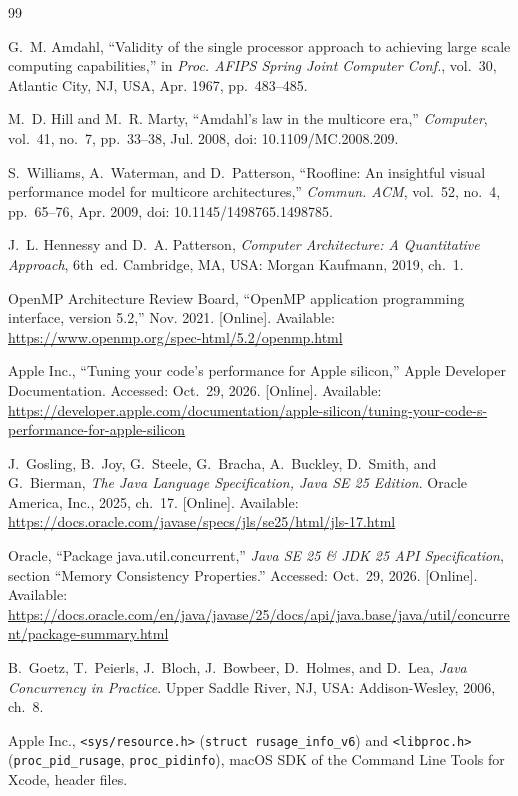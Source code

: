 \documentclass[11pt,a4paper]{article}
\begin{document}
\renewcommand{\refname}{References}
\begin{thebibliography}{99}\raggedright
\small

G.~M. Amdahl, ``Validity of the single processor approach to achieving large
scale computing capabilities,'' in \emph{Proc. AFIPS Spring Joint Computer
Conf.}, vol.~30, Atlantic City, NJ, USA, Apr. 1967, pp.~483--485.

M.~D. Hill and M.~R. Marty, ``Amdahl's law in the multicore era,''
\emph{Computer}, vol.~41, no.~7, pp.~33--38, Jul. 2008,
doi: 10.1109/MC.2008.209.

S.~Williams, A.~Waterman, and D.~Patterson, ``Roofline: An insightful visual
performance model for multicore architectures,'' \emph{Commun. ACM}, vol.~52,
no.~4, pp.~65--76, Apr. 2009, doi: 10.1145/1498765.1498785.

J.~L. Hennessy and D.~A. Patterson, \emph{Computer Architecture: A Quantitative
Approach}, 6th~ed. Cambridge, MA, USA: Morgan Kaufmann, 2019, ch.~1.

OpenMP Architecture Review Board, ``OpenMP application programming interface,
version 5.2,'' Nov. 2021. [Online]. Available:
\url{https://www.openmp.org/spec-html/5.2/openmp.html}

Apple Inc., ``Tuning your code's performance for Apple silicon,'' Apple
Developer Documentation. Accessed: Oct.~29, 2026. [Online]. Available:
\url{https://developer.apple.com/documentation/apple-silicon/tuning-your-code-s-performance-for-apple-silicon}

J.~Gosling, B.~Joy, G.~Steele, G.~Bracha, A.~Buckley, D.~Smith, and G.~Bierman,
\emph{The Java Language Specification, Java SE 25 Edition}. Oracle America,
Inc., 2025, ch.~17. [Online]. Available:
\url{https://docs.oracle.com/javase/specs/jls/se25/html/jls-17.html}

Oracle, ``Package java.util.concurrent,'' \emph{Java SE 25 \& JDK 25 API
Specification}, section ``Memory Consistency Properties.'' Accessed: Oct.~29,
2026. [Online]. Available:
\url{https://docs.oracle.com/en/java/javase/25/docs/api/java.base/java/util/concurrent/package-summary.html}

B.~Goetz, T.~Peierls, J.~Bloch, J.~Bowbeer, D.~Holmes, and D.~Lea, \emph{Java
Concurrency in Practice}. Upper Saddle River, NJ, USA: Addison-Wesley, 2006,
ch.~8.

Apple Inc., \texttt{<sys/resource.h>} (\texttt{struct rusage\_info\_v6}) and
\texttt{<libproc.h>} (\texttt{proc\_pid\_rusage}, \texttt{proc\_pidinfo}), macOS
SDK of the Command Line Tools for Xcode, header files.


\end{thebibliography}
\end{document}
